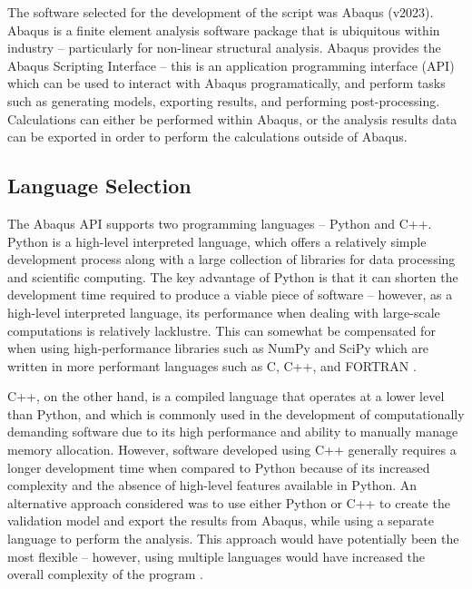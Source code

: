 The software selected for the development of the script was Abaqus (v2023). Abaqus is a finite element analysis software package that is ubiquitous within industry -- particularly for non-linear structural analysis. Abaqus provides the Abaqus Scripting Interface -- this is an application programming interface (API) which can be used to interact with Abaqus programatically, and perform tasks such as generating models, exporting results, and performing post-processing. Calculations can either be performed within Abaqus, or the analysis results data can be exported in order to perform the calculations outside of Abaqus.

\subsection{Language Selection}

The Abaqus API supports two programming languages -- Python and C++. Python is a high-level interpreted language, which offers a relatively simple development process along with a large collection of libraries for data processing and scientific computing. The key advantage of Python is that it can shorten the development time required to produce a viable piece of software -- however, as a high-level interpreted language, its performance when dealing with large-scale computations is relatively lacklustre. This can somewhat be compensated for when using high-performance libraries such as NumPy and SciPy which are written in more performant languages such as C, C++, and FORTRAN \cite{numpy_performance_nodate}.

C++, on the other hand, is a compiled language that operates at a lower level than Python, and which is commonly used in the development of computationally demanding software due to its high performance and ability to manually manage memory allocation. However, software developed using C++ generally requires a longer development time when compared to Python because of its increased complexity and the absence of high-level features available in Python. An alternative approach considered was to use either Python or C++ to create the validation model and export the results from Abaqus, while using a separate language to perform the analysis. This approach would have potentially been the most flexible -- however, using multiple languages would have increased the overall complexity of the program \cite{zehra_comparative_2020}.

